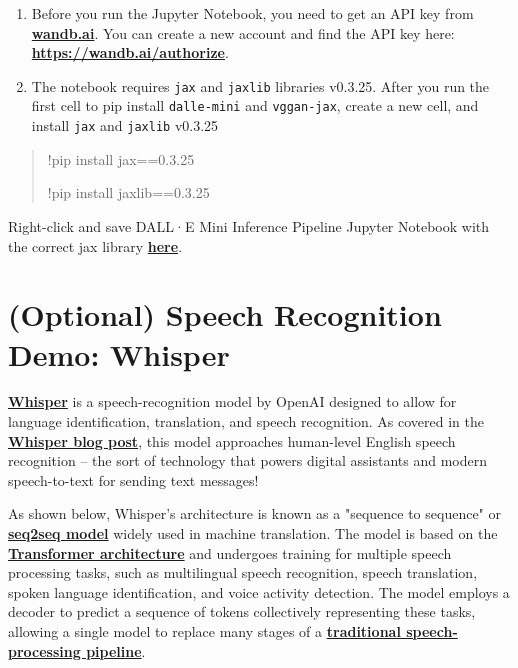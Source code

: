 \begin{enumerate}
    \item Before you run the Jupyter Notebook, you need to get an API key from \href{https://wandb.ai/}{\textbf{wandb.ai}}.
You can create a new account and find the API key here: \href{https://wandb.ai/authorize}{\textbf{https://wandb.ai/authorize}}.

    \item The notebook requires \verb|jax| and \verb|jaxlib| libraries v0.3.25.
After you run the first cell to pip install \verb|dalle-mini| and \verb|vggan-jax|, create a new cell, and install \verb|jax| and \verb|jaxlib| v0.3.25

\end{enumerate}

\begin{quote}
!pip install jax==0.3.25

!pip install jaxlib==0.3.25

\end{quote}

Right-click and save DALL·E Mini Inference Pipeline Jupyter Notebook with the correct jax library \href{https://video.udacity-data.com/topher/2023/March/641ba138_dalle_mini_inference_pipeline/dalle_mini_inference_pipeline.ipynb}{\textbf{here}}.

\section{(Optional) Speech Recognition Demo: Whisper}

\href{https://github.com/openai/whisper}{\textbf{Whisper}} is a speech-recognition model by OpenAI designed to allow for language identification, translation, and speech recognition. As covered in the \href{https://openai.com/research/whisper}{\textbf{Whisper blog post}}, this model approaches human-level English speech recognition -- the sort of technology that powers digital assistants and modern speech-to-text for sending text messages!

As shown below, Whisper's architecture is known as a "sequence to sequence" or \href{https://en.wikipedia.org/wiki/Seq2seq}{\textbf{seq2seq model}} widely used in machine translation. The model is based on the \href{https://en.wikipedia.org/wiki/Transformer_(machine_learning_model)}{\textbf{Transformer architecture}} and undergoes training for multiple speech processing tasks, such as multilingual speech recognition, speech translation, spoken language identification, and voice activity detection. The model employs a decoder to predict a sequence of tokens collectively representing these tasks, allowing a single model to replace many stages of a \href{https://www.researchgate.net/figure/Traditional-feature-extraction-pipeline-for-speech-processing-The-spectral-analysis_fig10_338935292}{\textbf{traditional speech-processing pipeline}}.

